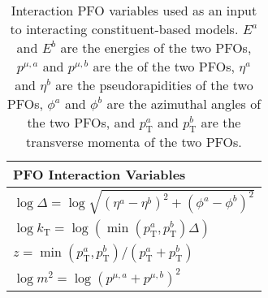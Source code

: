 \begin{table}[!htb]
    \centering
    \caption{Interaction PFO variables used as an input to interacting constituent-based models. $E^a$ and $E^b$ are the energies of the two PFOs, $p^{\mu, a}$ and $p^{\mu, b}$ are the  of the two PFOs, $\eta^a$ and $\eta^b$ are the pseudorapidities of the two PFOs, $\phi^a$ and $\phi^b$ are the azimuthal angles of the two PFOs, and $p_\mathrm{T}^a$ and $p_\mathrm{T}^b$ are the transverse momenta of the two PFOs. \cite{part}}
    \label{tab:pfo_interaction_variables}
    \begin{tabular}{l}
    \toprule
        PFO Interaction Variables \\
    \midrule
        $\log \Delta = \log{\sqrt{(\eta^a - \eta^b)^2 + (\phi^a - \phi^b)^2}}$ \\
        $\log k_\mathrm{T} = \log{(\min{(p_\mathrm{T}^a, p_\mathrm{T}^b)} \Delta)}$ \\
        $z = \min{(p_\mathrm{T}^a, p_\mathrm{T}^b)}/(p_\mathrm{T}^a + p_\mathrm{T}^b)$ \\
        $\log m^2 = \log{(p^{\mu, a} + p^{\mu, b})^2}$ \\
    \bottomrule
    \end{tabular}
\end{table}
    